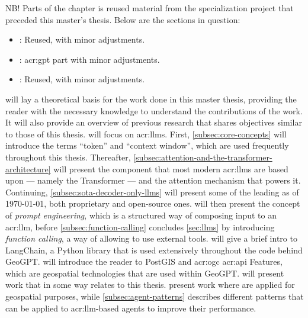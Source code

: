 \begin{itshape}
    NB! Parts of the  chapter is reused material from the specialization project \citep{holmLLMsDeathGIS2023} that preceded this master's thesis. Below are the sections in question:

    \begin{itemize}
        \item {}: Reused, with minor adjustments.
        \item {}: \acrshort{acr:gpt} part with minor adjustments.
        \item {}: Reused, with minor adjustments.
    \end{itemize}
\end{itshape}

\vspace{12pt}

\noindent {} will lay a theoretical basis for the work done in this master thesis, providing the reader with the necessary knowledge to understand the contributions of the work. It will also provide an overview of previous research that shares objectives similar to those of this thesis.  will focus on \glspl{acr:llm}. First, \autoref{subsec:core-concepts} will introduce the terms \enquote{token} and \enquote{context window}, which are used frequently throughout this thesis. Thereafter, \autoref{subsec:attention-and-the-transformer-architecture} will present the component that most modern \glspl{acr:llm} are based upon --- namely the Transformer --- and the attention mechanism that powers it. Continuing, \autoref{subsec:sota-decoder-only-llms} will present some of the leading  as of \today, both proprietary and open-source ones.  will then present the concept of \textit{prompt engineering}, which is a structured way of composing input to an \acrshort{acr:llm}, before \autoref{subsec:function-calling} concludes \autoref{sec:llms} by introducing \textit{function calling}, a way of allowing  to use external tools.  will give a brief intro to LangChain, a Python library that is used extensively throughout the code behind GeoGPT.  will introduce the reader to PostGIS and \acrshort{acr:ogc} \acrshort{acr:api} Features, which are geospatial technologies that are used within GeoGPT.  will present work that in some way relates to this thesis.  present work where  are applied for geospatial purposes, while \autoref{subsec:agent-patterns} describes different patterns that can be applied to \acrshort{acr:llm}-based agents to improve their performance.



